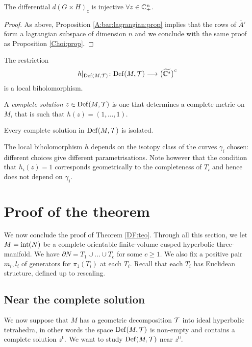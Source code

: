 \begin{prop} \label{Choi2:prop}
The differential $d(G\times H)_{z}$ is injective $\forall z \in \mathbb{C}_+^n$.
\end{prop}
\begin{proof}
As above, Proposition \ref{A:bar:lagrangian:prop} implies that the rows of $\bar A'$ form a lagrangian subspace of dimension $n$ and we conclude with the same proof as Proposition \ref{Choi:prop}.
\end{proof}

\begin{cor}
The restriction
$$h|_{{\rm Def}(M,\mathcal{T})}\colon {\rm Def}(M,\mathcal{T}) \longrightarrow \big(\widetilde{\mathbb{C}^*}\big)^c$$ is a local biholomorphism.
\end{cor}

A \emph{complete solution} $z\in{\rm Def}(M,\mathcal{T})$ is one that determines a complete metric on $M$, that is such that $h(z)=(1,\ldots,1)$.

\begin{cor} \label{complete:isolated:cor}
Every complete solution in ${\rm Def}(M,\mathcal{T})$ is isolated.
\end{cor}

The local biholomorphism $h$ depends on the isotopy class of the curves $\gamma_i$ chosen: different choices give different parametrisations. Note however that the condition that $h_i(z)=1$ corresponds geometrically to the completeness of $T_i$ and hence does not depend on $\gamma_i$.

\section{Proof of the theorem}
We now conclude the proof of Theorem \ref{DF:teo}.
Through all this section, we let $M= {\rm int}(N)$ be a complete orientable finite-volume cusped hyperbolic three-manifold. We have $\partial N = T_1 \cup \ldots \cup T_c$ for some $c\geqslant 1$. We also fix a positive pair $m_i, l_i$ of generators for $\pi_1(T_i)$ at each $T_i$. Recall that each $T_i$ has Euclidean structure, defined up to rescaling.

\subsection{Near the complete solution} \label{near:complete:subsection}
We now suppose that $M$ has a geometric decomposition $\mathcal{T}$ into ideal hyperbolic tetrahedra, in other words the space ${\rm Def}(M,\mathcal{T})$ is non-empty and contains a complete solution $z^0$. We want to study ${\rm Def}(M,\mathcal{T})$ near $z^0$. 

